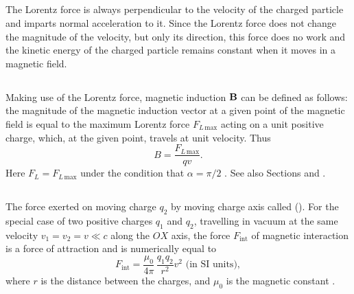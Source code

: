 \subsection{}\label{24.1.2}

The Lorentz force is always perpendicular to the velocity of the charged particle and imparts normal acceleration  to it. Since the Lorentz force does not change the magnitude of the velocity, but only its direction, this force does no work and the kinetic energy of the charged particle remains constant when it moves in a magnetic field. 

\subsection{}\label{24.1.3}

Making use of the Lorentz force, magnetic induction $\vb{B}$  can be defined as follows: the magnitude of the magnetic induction vector at a given point of the magnetic field is equal to the maximum Lorentz force $F_{L\,\text{max}}$ acting on a unit positive charge, which, at the given point, travels at unit velocity. Thus
\begin{equation*}%
B = \frac{F_{L\,\text{max}}}{qv}.
\end{equation*}
Here $F_{L} = F_{L\,\text{max}}$ under the condition that $\alpha = \pi/2$ . See also Sections  and .

\subsection{}\label{24.1.4}

The force exerted on moving charge $q_{2}$ by moving charge axis called  (). For the special case of two positive charges $q_{1}$ and $q_{2}$, travelling in vacuum at the same velocity $v_{1} = v_{2} = v \ll c$ along the $OX$ axis, the force $F_{\text{int}}$ of magnetic interaction is a force of attraction and is numerically equal to
\begin{equation*}%
F_{\text{int}} = \frac{\mu_{0}}{4 \pi}\, \frac{q_{1}q_{2}}{r^{2}} v^{2} \,\, \text{(in SI units)},
\end{equation*}
where $r$ is the distance between the charges, and $\mu_{0}$ is the magnetic constant .

